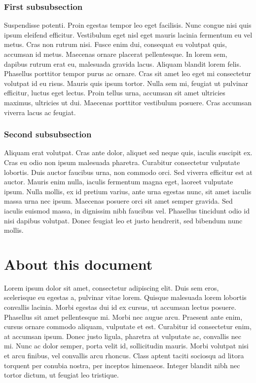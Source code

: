 \documentclass[10pt,a4paper,twoside,twocolumn]{article}
\begin{document}
\subsubsection{First subsubsection}

Suspendisse potenti. Proin egestas tempor leo eget facilisis. Nunc congue nisi quis ipsum eleifend efficitur. Vestibulum eget nisl eget mauris lacinia fermentum eu vel metus. Cras non rutrum nisi. Fusce enim dui, consequat eu volutpat quis, accumsan id metus. Maecenas ornare placerat pellentesque. In lorem sem, dapibus rutrum erat eu, malesuada gravida lacus. Aliquam blandit lorem felis. Phasellus porttitor tempor purus ac ornare. Cras sit amet leo eget mi consectetur volutpat id eu risus. Mauris quis ipsum tortor. Nulla sem mi, feugiat ut pulvinar efficitur, luctus eget lectus. Proin tellus urna, accumsan sit amet ultricies maximus, ultricies ut dui. Maecenas porttitor vestibulum posuere. Cras accumsan viverra lacus ac feugiat.

\subsubsection{Second subsubsection}

Aliquam erat volutpat. Cras ante dolor, aliquet sed neque quis, iaculis suscipit ex. Cras eu odio non ipsum malesuada pharetra. Curabitur consectetur vulputate lobortis. Duis auctor faucibus urna, non commodo orci. Sed viverra efficitur est at auctor. Mauris enim nulla, iaculis fermentum magna eget, laoreet vulputate ipsum. Nulla mollis, ex id pretium varius, ante urna egestas nunc, sit amet iaculis massa urna nec ipsum. Maecenas posuere orci sit amet semper gravida. Sed iaculis euismod massa, in dignissim nibh faucibus vel. Phasellus tincidunt odio id nisi dapibus volutpat. Donec feugiat leo et justo hendrerit, sed bibendum nunc mollis.

\appendix
\section{About this document}

Lorem ipsum dolor sit amet, consectetur adipiscing elit. Duis sem eros, scelerisque eu egestas a, pulvinar vitae lorem. Quisque malesuada lorem lobortis convallis lacinia. Morbi egestas dui id ex cursus, ut accumsan lectus posuere. Phasellus sit amet pellentesque mi. Morbi nec augue arcu. Praesent ante enim, cursus ornare commodo aliquam, vulputate et est. Curabitur id consectetur enim, at accumsan ipsum. Donec justo ligula, pharetra at vulputate ac, convallis nec mi. Nunc ac dolor semper, porta velit id, sollicitudin mauris. Morbi volutpat nisi et arcu finibus, vel convallis arcu rhoncus. Class aptent taciti sociosqu ad litora torquent per conubia nostra, per inceptos himenaeos. Integer blandit nibh nec tortor dictum, ut feugiat leo tristique.



\end{document}
